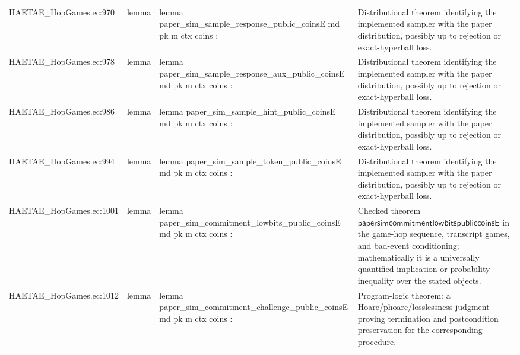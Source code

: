\documentclass[10pt]{article}
\begin{document}
\begin{longtable}{L{0.11\textwidth}L{0.055\textwidth}L{0.385\textwidth}L{0.41\textwidth}}
HAETAE\_\allowbreak{}HopGames.\allowbreak{}ec:\allowbreak{}970 & lemma & {\ttfamily\scriptsize lemma paper\_\allowbreak{}sim\_\allowbreak{}sample\_\allowbreak{}response\_\allowbreak{}public\_\allowbreak{}coinsE md pk m ctx coins :} & Distributional theorem identifying the implemented sampler with the paper distribution, possibly up to rejection or exact-hyperball loss. \\
HAETAE\_\allowbreak{}HopGames.\allowbreak{}ec:\allowbreak{}978 & lemma & {\ttfamily\scriptsize lemma paper\_\allowbreak{}sim\_\allowbreak{}sample\_\allowbreak{}response\_\allowbreak{}aux\_\allowbreak{}public\_\allowbreak{}coinsE md pk m ctx coins :} & Distributional theorem identifying the implemented sampler with the paper distribution, possibly up to rejection or exact-hyperball loss. \\
HAETAE\_\allowbreak{}HopGames.\allowbreak{}ec:\allowbreak{}986 & lemma & {\ttfamily\scriptsize lemma paper\_\allowbreak{}sim\_\allowbreak{}sample\_\allowbreak{}hint\_\allowbreak{}public\_\allowbreak{}coinsE md pk m ctx coins :} & Distributional theorem identifying the implemented sampler with the paper distribution, possibly up to rejection or exact-hyperball loss. \\
HAETAE\_\allowbreak{}HopGames.\allowbreak{}ec:\allowbreak{}994 & lemma & {\ttfamily\scriptsize lemma paper\_\allowbreak{}sim\_\allowbreak{}sample\_\allowbreak{}token\_\allowbreak{}public\_\allowbreak{}coinsE md pk m ctx coins :} & Distributional theorem identifying the implemented sampler with the paper distribution, possibly up to rejection or exact-hyperball loss. \\
HAETAE\_\allowbreak{}HopGames.\allowbreak{}ec:\allowbreak{}1001 & lemma & {\ttfamily\scriptsize lemma paper\_\allowbreak{}sim\_\allowbreak{}commitment\_\allowbreak{}lowbits\_\allowbreak{}public\_\allowbreak{}coinsE md pk m ctx coins :} & Checked theorem $\mathsf{papersimcommitmentlowbitspubliccoinsE}$ in the game-hop sequence, transcript games, and bad-event conditioning; mathematically it is a universally quantified implication or probability inequality over the stated objects. \\
HAETAE\_\allowbreak{}HopGames.\allowbreak{}ec:\allowbreak{}1012 & lemma & {\ttfamily\scriptsize lemma paper\_\allowbreak{}sim\_\allowbreak{}commitment\_\allowbreak{}challenge\_\allowbreak{}public\_\allowbreak{}coinsE md pk m ctx coins :} & Program-logic theorem: a Hoare/phoare/losslessness judgment proving termination and postcondition preservation for the corresponding procedure. \\

\end{longtable}
\end{document}
